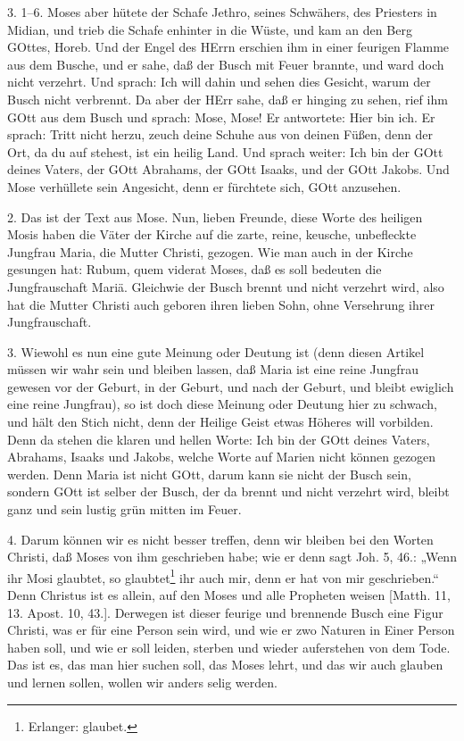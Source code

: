 3. 1–6. Moses aber hütete der Schafe Jethro, seines Schwähers, des Priesters in Midian, und trieb die Schafe enhinter in die Wüste, und kam an den Berg GOttes, Horeb. Und der Engel des HErrn erschien ihm in einer feurigen Flamme aus dem Busche, und er sahe, daß der Busch mit Feuer brannte, und ward doch nicht verzehrt. Und sprach: Ich will dahin und sehen dies Gesicht, warum der Busch nicht verbrennt. Da aber der HErr sahe, daß er hinging zu sehen, rief ihm GOtt aus dem Busch und sprach: Mose, Mose! Er antwortete: Hier bin ich. Er sprach: Tritt nicht herzu, zeuch deine Schuhe aus von deinen Füßen, denn der Ort, da du auf stehest, ist ein heilig Land. Und sprach weiter: Ich bin der GOtt deines Vaters, der GOtt Abrahams, der GOtt Isaaks, und der GOtt Jakobs. Und Mose verhüllete sein Angesicht, denn er fürchtete sich, GOtt anzusehen.

2. Das ist der Text aus Mose. Nun, lieben Freunde, diese Worte des heiligen Mosis haben die Väter der Kirche auf die zarte, reine, keusche, unbefleckte Jungfrau Maria, die Mutter Christi, gezogen. Wie man auch in der Kirche gesungen hat: Rubum, quem viderat Moses, daß es soll bedeuten die Jungfrauschaft Mariä. Gleichwie der Busch brennt und nicht verzehrt wird, also hat die Mutter Christi auch geboren ihren lieben Sohn, ohne Versehrung ihrer Jungfrauschaft.

3. Wiewohl es nun eine gute Meinung oder Deutung ist (denn diesen Artikel müssen wir wahr sein und bleiben lassen, daß Maria ist eine reine Jungfrau gewesen vor der Geburt, in der Geburt, und nach der Geburt, und bleibt ewiglich eine reine Jungfrau), so ist doch diese Meinung oder Deutung hier zu schwach, und hält den Stich nicht, denn der Heilige Geist etwas Höheres will vorbilden. Denn da stehen die klaren und hellen Worte: Ich bin der GOtt deines Vaters, Abrahams, Isaaks und Jakobs, welche Worte auf Marien nicht können gezogen werden. Denn Maria ist nicht GOtt, darum kann sie nicht der Busch sein, sondern GOtt ist selber der Busch, der da brennt und nicht verzehrt wird, bleibt ganz und sein lustig grün mitten im Feuer.

4. Darum können wir es nicht besser treffen, denn wir bleiben bei den Worten Christi, daß Moses von ihm geschrieben habe; wie er denn sagt Joh. 5, 46.: „Wenn ihr Mosi glaubtet, so glaubtet\footnote{Erlanger: glaubet.} ihr auch mir, denn er hat von mir geschrieben.“ Denn Christus ist es allein, auf den Moses und alle Propheten weisen [Matth. 11, 13. Apost. 10, 43.]. Derwegen ist dieser feurige und brennende Busch eine Figur Christi, was er für eine Person sein wird, und wie er zwo Naturen in Einer Person haben soll, und wie er soll leiden, sterben und wieder auferstehen von dem Tode. Das ist es, das man hier suchen soll, das Moses lehrt, und das wir auch glauben und lernen sollen, wollen wir anders selig werden.

